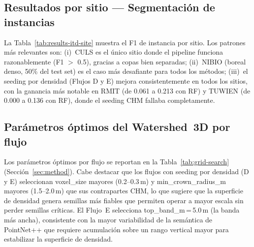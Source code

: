 \documentclass[runningheads]{llncs}
\begin{document}
\subsection{Resultados por sitio --- Segmentaci\'on de instancias}

La Tabla~\ref{tab:results-itd-site} muestra el F1 de instancia por sitio. Los patrones m\'as relevantes son: (i)~CULS es el \'unico sitio donde el pipeline funciona razonablemente (F1 $>$ 0.5), gracias a copas bien separadas; (ii)~NIBIO (boreal denso, 50\% del test set) es el caso m\'as desafiante para todos los m\'etodos; (iii)~el seeding por densidad (Flujos D y E) mejora consistentemente en todos los sitios, con la ganancia m\'as notable en RMIT (de 0.061 a 0.213 con RF) y TUWIEN (de 0.000 a 0.136 con RF), donde el seeding CHM fallaba completamente.

\begin{table}[t]
\centering
\caption{F1 de instancia (IoU 3D~$\geq 0.5$) por sitio y flujo sobre el conjunto de test. Promedio no ponderado por sitio.}\label{tab:results-itd-site}
\end{table}

\subsection{Par\'ametros \'optimos del Watershed~3D por flujo}

Los par\'ametros \'optimos por flujo se reportan en la Tabla~\ref{tab:grid-search} (Secci\'on~\ref{sec:method}). Cabe destacar que los flujos con seeding por densidad (D y E) seleccionan voxel\_size mayores (0.2--0.3\,m) y min\_crown\_radius\_m mayores (1.5--2.0\,m) que sus contrapartes CHM, lo que sugiere que la superficie de densidad genera semillas m\'as fiables que permiten operar a mayor escala sin perder semillas cr\'iticas. El Flujo~E selecciona top\_band\_m\,=\,5.0\,m (la banda m\'as ancha), consistente con la mayor variabilidad de la sem\'antica de PointNet++ que requiere acumulaci\'on sobre un rango vertical mayor para estabilizar la superficie de densidad.
\end{document}
